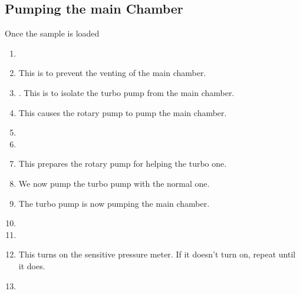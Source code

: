  \subsection{Pumping the main Chamber}
 Once the sample is loaded
 \begin{enumerate}
 \item {}
 \item {} This is to prevent the venting
   of the main chamber.
 \item {}. This is to isolate the turbo pump from the main chamber.
 \item  {} This causes the rotary pump to pump the main chamber.
 \item  {}
 \item {}
 \item   {}  This prepares the rotary pump
   for helping the turbo one.
 \item {} We now pump the turbo pump with the normal one.
 \item {} The turbo pump is now pumping the main chamber.
 \item {}
 \item {}
 \item {} This  turns on the
   sensitive pressure meter.  If it  doesn't turn on, repeat until it
   does.
 \item {}
 \end{enumerate}


